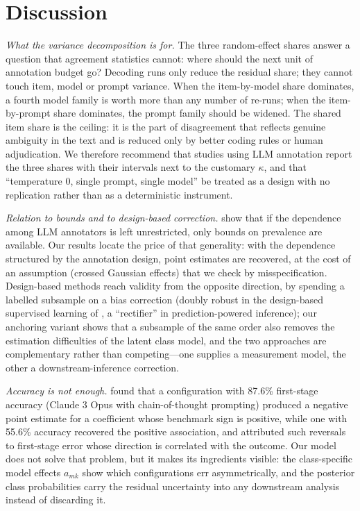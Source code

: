 \section{Discussion}\label{sec:discussion}

\emph{What the variance decomposition is for.} The three random-effect shares answer a question that agreement statistics cannot: where should the next unit of annotation budget go? Decoding runs only reduce the residual share; they cannot touch item, model or prompt variance. When the item-by-model share dominates, a fourth model family is worth more than any number of re-runs; when the item-by-prompt share dominates, the prompt family should be widened. The shared item share is the ceiling: it is the part of disagreement that reflects genuine ambiguity in the text and is reduced only by better coding rules or human adjudication. We therefore recommend that studies using LLM annotation report the three shares with their intervals next to the customary $\kappa$, and that ``temperature 0, single prompt, single model'' be treated as a design with no replication rather than as a deterministic instrument.

\emph{Relation to bounds and to design-based correction.} \citet{Chen2026} show that if the dependence among LLM annotators is left unrestricted, only bounds on prevalence are available. Our results locate the price of that generality: with the dependence structured by the annotation design, point estimates are recovered, at the cost of an assumption (crossed Gaussian effects) that we check by misspecification. Design-based methods \citep{Egami2024,Angelopoulos2023} reach validity from the opposite direction, by spending a labelled subsample on a bias correction (doubly robust in the design-based supervised learning of \citet{Egami2024}, a ``rectifier'' in prediction-powered inference); our anchoring variant shows that a subsample of the same order also removes the estimation difficulties of the latent class model, and the two approaches are complementary rather than competing---one supplies a measurement model, the other a downstream-inference correction.

\emph{Accuracy is not enough.} \citet{Carlson2025} found that a configuration with 87.6\% first-stage accuracy (Claude 3 Opus with chain-of-thought prompting) produced a negative point estimate for a coefficient whose benchmark sign is positive, while one with 55.6\% accuracy recovered the positive association, and attributed such reversals to first-stage error whose direction is correlated with the outcome. Our model does not solve that problem, but it makes its ingredients visible: the class-specific model effects $a_{mk}$ show which configurations err asymmetrically, and the posterior class probabilities carry the residual uncertainty into any downstream analysis instead of discarding it.

